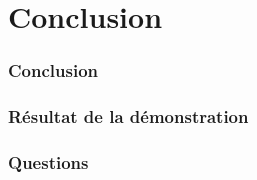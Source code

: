 \section{Conclusion}
\begin{frame}
\frametitle{Conclusion}

\end{frame}


 \begin{frame}
 \frametitle{Résultat de la démonstration}

\end{frame}

 \begin{frame}
 \frametitle{Questions}

\end{frame}